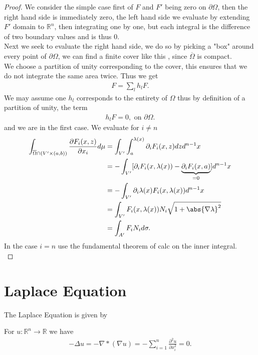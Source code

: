 \begin{proof}
  We consider the simple case first of $F$ and $F'$ being zero on $\partial \Omega $, then the right hand side is immediately zero,
  the left hand side we evaluate by extending $F'$ domain to $\mathbb{R}^{n} $, then integrating one by one, but each integral is 
  the difference of two boundary values and is thus 0.\\[1ex]
  Next we seek to evaluate the right hand side, we do so by picking a "box"  around every point of $\partial \Omega $,
  we can find a finite cover like this , since $\overline{\Omega } $ is compact.\\
  We choose a partition of unity corresponding to the cover, this ensures that we do not integrate the same area twice.
  Thus we get 
  \begin{align*}
    F = \sum_{l} h_l F
  .\end{align*}
  We may assume one $h_l$ corresponds to the entirety of $\Omega $ thus by definition of a partition of unity, the term
  \begin{align*}
    h_l F  = 0 , \text{ on } \partial \Omega 
  .\end{align*}
  and we are in the first case.
  We evaluate for $i\neq n$
  \begin{align*}
    \int_{\overline{\Omega } \cap (V' \times  (a,b)) } \frac{\partial F_i(x,z)}{\partial x_i} d\mu  &= \int_{V'}\int_{a}^{\lambda(x)}  \partial_i F_i(x,z) dz d^{n-1} x \\
                                                                                                    &= -\int_{V'} [\partial_i F_i(x,\lambda(x) ) -\underbrace{\partial_i F_i(x,a)}_{=0}] d^{n-1} x \\
                                                                                                    &= -\int_{V'} \partial_i \lambda(x) F_i(x,\lambda(x))  d^{n-1}x  \\ 
                                                                                                    &= \int_{V'} F_i(x,\lambda(x))N_i \sqrt{1 + \abs{\nabla \lambda }^2}  \\
                                                                                                    &= \int_{A'} F_i N_i d\sigma 
  .\end{align*}
  In the case $i=n$ use the fundamental theorem of calc on the inner integral.\\
\end{proof}
\chapter{Laplace Equation}
The Laplace Equation is given by 
\begin{definition}
 For $u : \mathbb{R}^{n} \to  \mathbb{R} $  we have 
 \begin{align*}
   -\Delta u = - \nabla * (\nabla u)  = -\sum_{i=1}^{n} \frac{\partial ^2 u}{\partial x_i^2}  = 0
 .\end{align*}
\end{definition}
